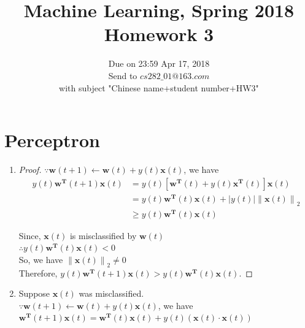 \documentclass{article}
\newcommand{\norm}[2]{\left\| #1 \right\|_{#2}}
\begin{document}
\title{Machine Learning, Spring 2018\\Homework 3}
\date{Due on 23:59 Apr 17, 2018\\Send to $cs282\_01@163.com$ \\with subject "Chinese name+student number+HW3"}
\maketitle




\section{Perceptron}


\begin{enumerate}[(1)]
\item 
\begin{proof}
$\because \bm{w}(t+1) \leftarrow \bm{w}(t) + y(t)\bm{x}(t)$, we have\\
\begin{equation}
\begin{aligned}
y(t)\bm{w^T}(t+1)\bm{x}(t) &= y(t)[\bm{w^T}(t) + y(t)\bm{x^T}(t)]\bm{x}(t)\\
&=y(t)\bm{w^T}(t)\bm{x}(t) + |y(t)|\norm{\bm{x}(t)}{2}\\
&\geq y(t)\bm{w^T}(t)\bm{x}(t)
\end{aligned}
\end{equation}

Since, $\bm{x}(t)$ is misclassified by $\bm{w}(t)$\\
$\therefore y(t)\bm{w^T}(t)\bm{x}(t)<0$\\
So, we have $\norm{\bm{x}(t)}{2}\neq 0$\\
Therefore, $y(t)\bm{w^T}(t+1)\bm{x}(t)>y(t)\bm{w^T}(t)\bm{x}(t)$.
\end{proof}
\item Suppose $\bm{x}(t)$ was misclassified.\\
$\because \bm{w}(t+1) \leftarrow \bm{w}(t) + y(t)\bm{x}(t)$, we have\\
$\bm{w^T}(t+1)\bm{x}(t) = \bm{w^T}(t)\bm{x}(t) + y(t)(\bm{x}(t)\cdot \bm{x}(t))$\\


\end{enumerate}
\end{document}
